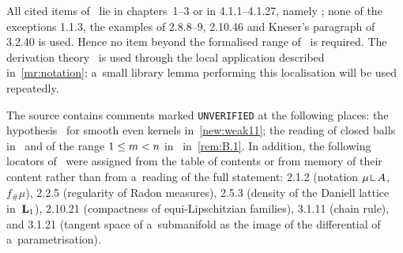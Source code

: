 \documentclass[a4paper,twoside,leqno]{article}
\begin{document}
\begin{remark}
    \label{rem:federer}
    All cited items of~\cite{Federer1969} lie in chapters~1--3 or in 4.1.1--4.1.27, namely
    \cite[4.1.2, 4.1.5]{Federer1969}; none of the exceptions 1.1.3, the examples of 2.8.8--9,
    2.10.46 and Kneser's paragraph of 3.2.40 is used. Hence no item beyond the formalised range
    of~\cite{Federer1969} is required. The derivation theory~\cite[2.8.18, 2.9]{Federer1969} is
    used through the local application described in~\ref{mr:notation}; a~small library lemma
    performing this localisation will be used repeatedly.
\end{remark}

\begin{remark}
    \label{rem:unverified}
    The source contains comments marked \texttt{UNVERIFIED} at the following places: the
    hypothesis~\cite[(5.2.24)]{Grafakos2014} for smooth even kernels in~\ref{new:weak11}; the
    reading of closed balls in~\cite[1.1]{Preiss1987} and of the range $1 \le m < n$
    in~\cite[5.3]{Preiss1987} in~\ref{rem:B.1}. In addition, the following locators
    of~\cite{Federer1969} were assigned from the table of contents or from memory of their content
    rather than from a~reading of the full statement: 2.1.2 (notation $\mu \restrict A$, $f_\#
    \mu$), 2.2.5 (regularity of Radon measures), 2.5.3 (density of the Daniell lattice in~$\mathbf{L}_{1}$),
    2.10.21 (compactness of equi-Lipschitzian families), 3.1.11 (chain rule), and 3.1.21
    (tangent space of a~submanifold as the image of the differential of a~parametrisation).
\end{remark}
\end{document}
